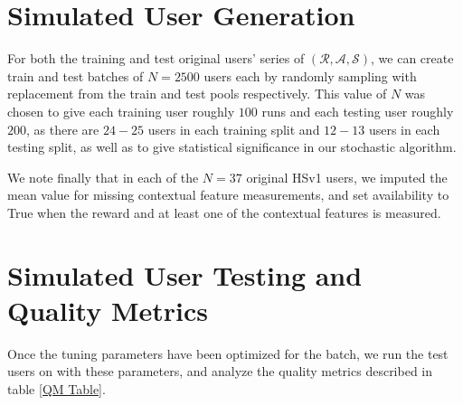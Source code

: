 \section{Simulated User Generation}
\label{Simulated User Generation}

For both the training and test original users' series of $(\mathcal{R}, \mathcal{A}, \mathcal{S})$, we can create train and test batches of $N = 2500$ users each by randomly sampling with replacement from the train and test pools respectively.  This value of $N$ was chosen to give each training user roughly $100$ runs and each testing user roughly $200$, as there are $24-25$ users in each training split and $12-13$ users in each testing split, as well as to give statistical significance in our stochastic algorithm.

We note finally that in each of the $N = 37$ original HSv1 users, we imputed the mean value for missing contextual feature measurements, and set availability to True when the reward and at least one of the contextual features is measured.



\section{Simulated User Testing and Quality Metrics}

Once the tuning parameters have been optimized for the batch, we run the test users on with these parameters, and analyze the quality metrics described in table \ref{QM Table}.

